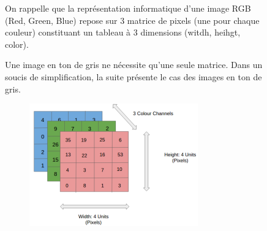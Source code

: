 \documentclass{article}
\begin{document}
\begin{figure}[H]
\begin{minipage}[c]{0.4\linewidth}

On rappelle que la représentation informatique d'une image RGB (Red, Green, Blue) 
repose sur 3 matrice de pixels (une pour chaque couleur) constituant un tableau à 
3 dimensions (witdh, heihgt, color).

Une image en ton de gris ne nécessite qu'une seule matrice. 
Dans un soucis de simplification, la suite présente le cas des images en ton de gris.

\end{minipage} \hfill
\begin{minipage}[c]{0.6\linewidth}

\begin{figure}[H]
\centering
\includegraphics[width=0.8\textwidth]{img/rgb.png}
\end{figure}


\end{minipage}
\end{figure}
\end{document}
